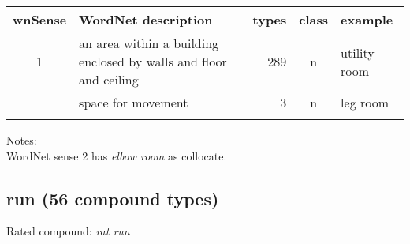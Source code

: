 \vspace*{1ex}

\noindent
\begin{longtable}{c>{\raggedright\arraybackslash}p{5cm}rc>{\raggedright\arraybackslash}p{2cm}}\lsptoprule
{\small wnSense}&WordNet description&types&class&example\\\midrule
1&an area within a building enclosed by walls and floor and ceiling&289&n&utility room\\\tablevspace
2&space for movement&3&n&leg room\\\lspbottomrule
\end{longtable}

\noindent
Notes:\\
WordNet sense 2 has \emph{elbow room} as collocate. 

\pagebreak[4]
\subsection{run       (56 compound types)}
Rated compound: \emph{rat run}

\vspace*{1ex}

